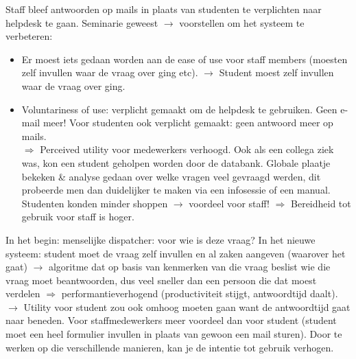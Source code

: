 \documentclass[10pt,a4paper]{report}
\begin{document}
Staff bleef antwoorden op mails in plaats van studenten te verplichten naar helpdesk te gaan.
Seminarie geweest $\rightarrow$ voorstellen om het systeem te verbeteren:
\begin{itemize}
\item Er moest iets gedaan worden aan de ease of use voor staff members (moesten zelf invullen waar de vraag over ging etc). $\rightarrow$ Student moest zelf invullen waar de vraag over ging.
\item Voluntariness of use: verplicht gemaakt om de helpdesk te gebruiken. Geen e-mail meer! Voor studenten ook verplicht gemaakt: geen antwoord meer op mails.\\
$\Rightarrow$ Perceived utility voor medewerkers verhoogd. Ook als een collega ziek was, kon een student geholpen worden door de databank. Globale plaatje bekeken \& analyse gedaan over welke vragen veel gevraagd werden, dit probeerde men dan duidelijker te maken via een infosessie of een manual. Studenten konden minder shoppen $\rightarrow$ voordeel voor staff! $\Rightarrow$ Bereidheid tot gebruik voor staff is hoger.
\end{itemize}
In het begin: menselijke dispatcher: voor wie is deze vraag? In het nieuwe systeem: student moet de vraag zelf invullen en al zaken aangeven (waarover het gaat) $\rightarrow$ algoritme dat op basis van kenmerken van die vraag beslist wie die vraag moet beantwoorden, dus veel sneller dan een persoon die dat moest verdelen $\Rightarrow$ performantieverhogend (productiviteit stijgt, antwoordtijd daalt). $\rightarrow$ Utility voor student zou ook omhoog moeten gaan want de antwoordtijd gaat naar beneden. Voor staffmedewerkers meer voordeel dan voor student (student moet een heel formulier invullen in plaats van gewoon een mail sturen). Door te werken op die verschillende manieren, kan je de intentie tot gebruik verhogen.
\end{document}
